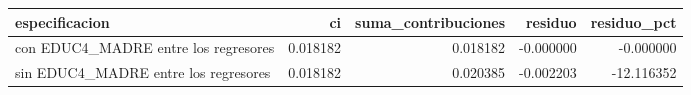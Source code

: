 \begin{tabular}{lrrrr}
\toprule
especificacion & ci & suma\_contribuciones & residuo & residuo\_pct \\
\midrule
con EDUC4\_MADRE entre los regresores & 0.018182 & 0.018182 & -0.000000 & -0.000000 \\
sin EDUC4\_MADRE entre los regresores & 0.018182 & 0.020385 & -0.002203 & -12.116352 \\
\bottomrule
\end{tabular}
